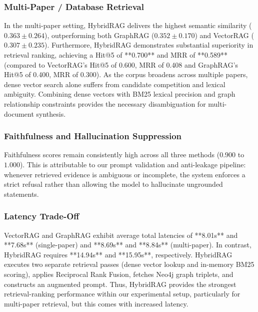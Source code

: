 \documentclass[conference]{IEEEtran}
\begin{document}
\subsubsection{Multi-Paper / Database Retrieval}
In the multi-paper setting, HybridRAG delivers the highest semantic similarity ($0.363 \pm 0.264$), outperforming both GraphRAG ($0.352 \pm 0.170$) and VectorRAG ($0.307 \pm 0.235$). Furthermore, HybridRAG demonstrates substantial superiority in retrieval ranking, achieving a Hit@5 of **0.700** and MRR of **0.589** (compared to VectorRAG's Hit@5 of 0.600, MRR of 0.408 and GraphRAG's Hit@5 of 0.400, MRR of 0.300). As the corpus broadens across multiple papers, dense vector search alone suffers from candidate competition and lexical ambiguity. Combining dense vectors with BM25 lexical precision and graph relationship constraints provides the necessary disambiguation for multi-document synthesis.

\subsubsection{Faithfulness and Hallucination Suppression}
Faithfulness scores remain consistently high across all three methods ($0.900$ to $1.000$). This is attributable to our prompt validation and anti-leakage pipeline: whenever retrieved evidence is ambiguous or incomplete, the system enforces a strict refusal rather than allowing the model to hallucinate ungrounded statements.

\subsubsection{Latency Trade-Off}
VectorRAG and GraphRAG exhibit average total latencies of **8.01s** and **7.68s** (single-paper) and **8.69s** and **8.84s** (multi-paper). In contrast, HybridRAG requires **14.94s** and **15.95s**, respectively. HybridRAG executes two separate retrieval passes (dense vector lookup and in-memory BM25 scoring), applies Reciprocal Rank Fusion, fetches Neo4j graph triplets, and constructs an augmented prompt. Thus, HybridRAG provides the strongest retrieval-ranking performance within our experimental setup, particularly for multi-paper retrieval, but this comes with increased latency.
\end{document}
